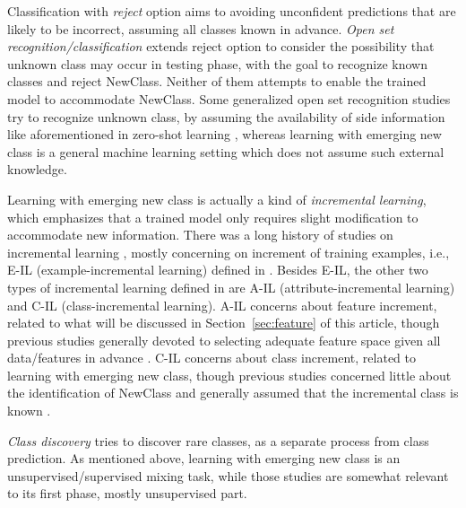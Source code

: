 \documentclass[review,11pt]{ReportTemplate}
\begin{document}
Classification with \textit{reject} option \cite{Fumera:Roli:Giacinto2000,Bartlett:Wegkamp2008,Geifman:ElYaniv2019} aims to avoiding unconfident predictions that are likely to be incorrect, assuming all classes known in advance. \textit{Open set recognition/classification} \cite{Scheirer:Rocha:Sapkota2013,Geng:Huang:Chen2020} extends reject option to consider the possibility that unknown class may occur in testing phase, with the goal to recognize known classes and reject NewClass. Neither of them attempts to enable the trained model to accommodate NewClass. Some generalized open set recognition studies try to recognize unknown class, by assuming the availability of side information like aforementioned in zero-shot learning \cite{Geng:Huang:Chen2020}, whereas learning with emerging new class is a general machine learning setting which does not assume such external knowledge.

Learning with emerging new class is actually a kind of \textit{incremental learning}, which emphasizes that a trained model only requires slight modification to accommodate new information. There was a long history of studies on incremental learning \cite{Utgoff1989,Syed:Liu:Sung1999,GiraudCarrier2000,He:Chen:Li:Xu2011}, mostly concerning on increment of training examples, i.e., E-IL (example-incremental learning) defined in \cite{Zhou:Chen2002}. Besides E-IL, the other two types of incremental learning defined in \cite{Zhou:Chen2002} are A-IL (attribute-incremental learning) and C-IL (class-incremental learning). A-IL concerns about feature increment, related to what will be discussed in Section~\ref{sec:feature} of this article, though previous studies generally devoted to selecting adequate feature space given all data/features in advance \cite{Ozawa:Toh:Abe:Pang2005,Zhou:Sohn:Lee2012}. C-IL concerns about class increment, related to learning with emerging new class, though previous studies concerned little about the identification of NewClass and generally assumed that the incremental class is known \cite{Masana:Liu:Twardowski2020}.

\textit{Class discovery} \cite{Golub:Slonim:Tamayo:Huard1999,Monti:Tamayo:Mesirov:Golub2003} tries to discover rare classes, as a separate process from class prediction. As mentioned above, learning with emerging new class is an unsupervised/supervised mixing task, while those studies are somewhat relevant to its first phase, mostly unsupervised part.
\end{document}
